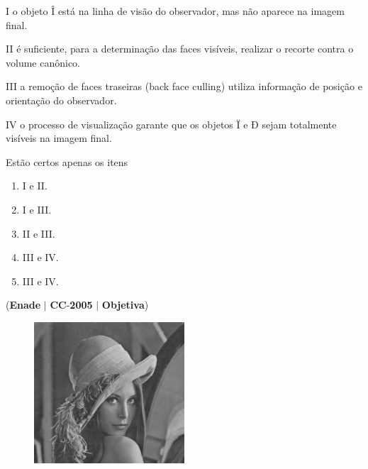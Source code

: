 \documentclass{exam}
\begin{document}
\begin{questions}
I o objeto Î está na linha de visão do observador, mas não
aparece na imagem final.

II é suficiente, para a determinação das faces visíveis, realizar o
recorte contra o volume canônico.

III a remoção de faces traseiras (back face culling) utiliza
informação de posição e orientação do observador.

IV o processo de visualização garante que os objetos Ï e Ð sejam
totalmente visíveis na imagem final.

Estão certos apenas os itens
	\begin{enumerate}[label=\alph*)]
		\item  I e II.
		\item  I e III.
		\item  II e III.
		\item  III e IV.
		\item  III e IV.
	\end{enumerate}

\question (\textbf{Enade} $|$ \textbf{CC}-\textbf{2005} $|$ \textbf{Objetiva})

\begin{figure}[H]
	\begin{center}
		\includegraphics[width=0.5\textwidth]{CIENCIA_DA_COMPUTACAO_Prova2005-utf8_figuras/fig-0027.jpg}
	\end{center}
\end{figure}


\end{questions}
\end{document}
